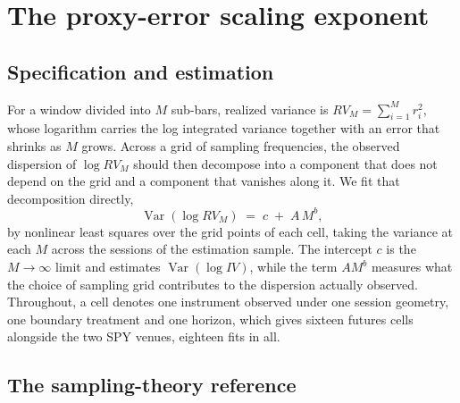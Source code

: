 \section{The proxy-error scaling exponent}\label{sec:exponent}

\subsection{Specification and estimation}

For a window divided into $M$ sub-bars, realized variance is
$RV_M = \sum_{i=1}^{M} r_i^2$, whose logarithm carries the log integrated
variance together with an error that shrinks as $M$ grows. Across a grid of
sampling frequencies, the observed dispersion of $\log RV_M$ should then
decompose into a component that does not depend on the grid and a component that
vanishes along it. We fit that decomposition directly,
\begin{equation}\label{eq:scaling}
\operatorname{Var}\!\left(\log RV_M\right) \;=\; c \;+\; A\,M^{b},
\end{equation}
by nonlinear least squares over the grid points of each cell, taking the variance
at each $M$ across the sessions of the estimation sample. The intercept $c$ is the
$M \to \infty$ limit and estimates $\operatorname{Var}(\log IV)$, while the term
$A M^{b}$ measures what the choice of sampling grid contributes to the dispersion
actually observed. Throughout, a cell denotes one instrument observed under one
session geometry, one boundary treatment and one horizon, which gives sixteen
futures cells alongside the two SPY venues, eighteen fits in all.

\subsection{The sampling-theory reference}

